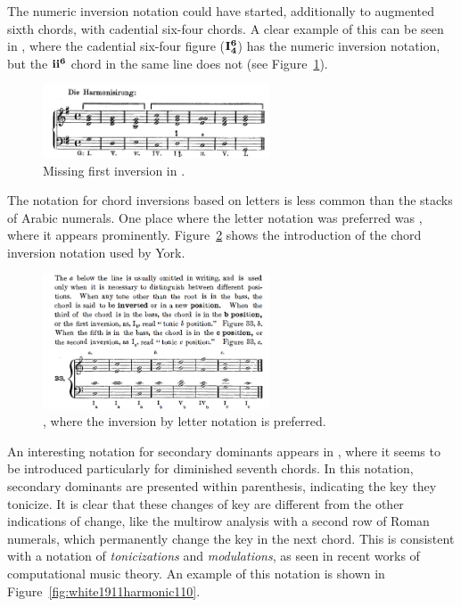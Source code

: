 The numeric inversion notation could have started, additionally to augmented sixth chords, with cadential six-four chords.
A clear example of this can be seen in \textcite{loewengard1908lehrbuch}, where the cadential six-four figure ($\textbf{I}\relax\relax{\footnotesize {}^\textbf{6}\relax_\textbf{4}\relax\relax}$) has the numeric inversion notation, but the $\textbf{ii}\relax\relax{\footnotesize {}^\textbf{6}\relax\relax}$ chord in the same line does not (see Figure~\ref{fig:loewengard1908lehrbuch045}).

\begin{figure}[h!]
    \centering
    \includegraphics[width=0.6\textwidth]{figures/chapter/2/primary_sources/loewengard1908lehrbuch045.png}
    \caption{Missing first inversion in \textcite{loewengard1908lehrbuch}.}
    \label{fig:loewengard1908lehrbuch045}
\end{figure}

The notation for chord inversions based on letters is less common than the stacks of Arabic numerals.
One place where the letter notation was preferred was \textcite{york1909practical}, where it appears prominently.
Figure~\ref{fig:york1909practical019} shows the introduction of the chord inversion notation used by York.

\begin{figure}[h!]
    \centering
    \includegraphics[width=0.6\textwidth]{figures/chapter/2/primary_sources/york1909practical019.png}
    \caption{\textcite{york1909practical}, where the inversion by letter notation is preferred.}
    \label{fig:york1909practical019}
\end{figure}

An interesting notation for secondary dominants appears in \textcite{white1911harmonic}, where it seems to be introduced particularly for diminished seventh chords.
In this notation, secondary dominants are presented within parenthesis, indicating the key they tonicize.
It is clear that these changes of key are different from the other indications of change, like the multirow analysis with a second row of Roman numerals, which permanently change the key in the next chord.
This is consistent with a notation of \emph{tonicizations} and \emph{modulations}, as seen in recent works of computational music theory.
An example of this notation is shown in Figure~\ref{fig:white1911harmonic110}.

